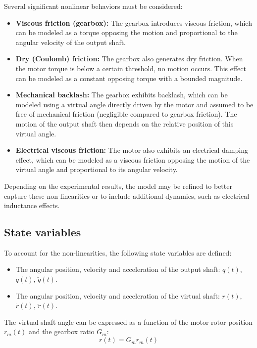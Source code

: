 \documentclass[english,12pt,a4paper]{article}
\begin{document}
	Several significant nonlinear behaviors must be considered:
	\begin{itemize}
		\item \textbf{Viscous friction (gearbox):} The gearbox introduces viscous friction, which can be modeled as a torque opposing the motion and proportional to the angular velocity of the output shaft.
		
		\item \textbf{Dry (Coulomb) friction:} The gearbox also generates dry friction. When the motor torque is below a certain threshold, no motion occurs. This effect can be modeled as a constant opposing torque with a bounded magnitude.
		
		\item \textbf{Mechanical backlash:} The gearbox exhibits backlash, which can be modeled using a virtual angle directly driven by the motor and assumed to be free of mechanical friction (negligible compared to gearbox friction). The motion of the output shaft then depends on the relative position of this virtual angle.
		
		\item \textbf{Electrical viscous friction:} The motor also exhibits an electrical damping effect, which can be modeled as a viscous friction opposing the motion of the virtual angle and proportional to its angular velocity.
	\end{itemize}
	
	Depending on the experimental results, the model may be refined to better capture these non-linearities or to include additional dynamics, such as electrical inductance effects.	
	
	\subsection{State variables}

		To account for the non-linearities, the following state variables are defined:
		\begin{itemize}
			\item The angular position, velocity and acceleration of the output shaft: $q(t)$, $\dot{q}(t)$, $\ddot{q}(t)$.
			\item The angular position, velocity and acceleration of the virtual shaft: $r(t)$, $\dot{r}(t)$, $\ddot{r}(t)$.
		\end{itemize}
		
		The virtual shaft angle can be expressed as a function of the motor rotor position $r_m(t)$ and the gearbox ratio $G_m$:
		\begin{equation}
			r(t) = G_m r_m(t)
		\end{equation}
	
\end{document}
